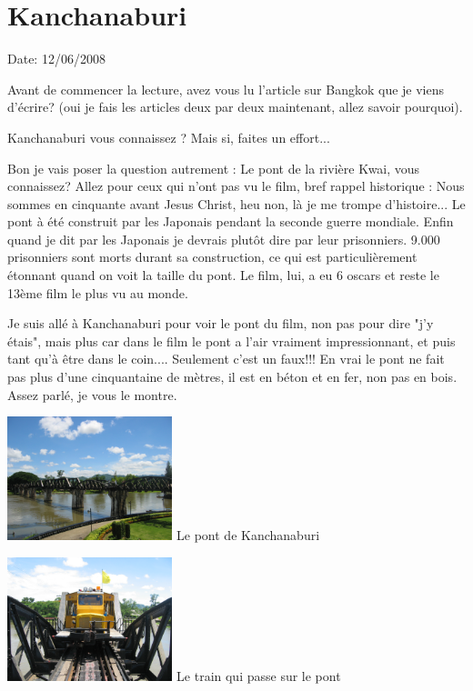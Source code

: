 \section{Kanchanaburi}

Date: 12/06/2008

\begin{multicols}{2}

Avant de commencer la lecture, avez vous lu l'article sur Bangkok que je viens d'écrire? (oui je fais les articles deux par deux maintenant, allez savoir pourquoi).

Kanchanaburi vous connaissez ? Mais si, faites un effort...

Bon je vais poser la question autrement : Le pont de la rivière Kwai, vous connaissez? Allez pour ceux qui n'ont pas vu le film, bref rappel historique : Nous sommes en cinquante avant Jesus Christ, heu non, là je me trompe d'histoire... Le pont à été construit par les Japonais pendant la seconde guerre mondiale. Enfin quand je dit par les Japonais je devrais plutôt dire par leur prisonniers. 9.000 prisonniers sont morts durant sa construction, ce qui est particulièrement étonnant quand on voit la taille du pont. Le film, lui, a eu 6 oscars et reste le 13ème film le plus vu au monde.

Je suis allé à Kanchanaburi pour voir le pont du film, non pas pour dire "j'y étais", mais plus car dans le film le pont a l'air vraiment impressionnant, et puis tant qu'à être dans le coin.... Seulement c'est un faux!!! En vrai le pont ne fait pas plus d'une cinquantaine de mètres, il est en béton et en fer, non pas en bois. Assez parlé, je vous le montre.

\hspace*{-0.65cm}
\includegraphics[width=4.8cm]{articles/Kanchanaburi/1400.jpg}
Le pont de Kanchanaburi


\hspace*{-0.65cm}
\includegraphics[width=4.8cm]{articles/Kanchanaburi/1401.jpg}
Le train qui passe sur le pont




\end{multicols}
